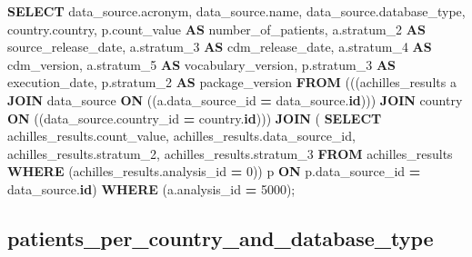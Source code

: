 \documentclass[
]{book}
\newenvironment{Shaded}{\begin{snugshade}}{\end{snugshade}}
\newcommand{\DecValTok}[1]{\textcolor[rgb]{0.00,0.00,0.81}{#1}}
\newcommand{\KeywordTok}[1]{\textcolor[rgb]{0.13,0.29,0.53}{\textbf{#1}}}
\newcommand{\NormalTok}[1]{#1}
\newcommand{\OperatorTok}[1]{\textcolor[rgb]{0.81,0.36,0.00}{\textbf{#1}}}
\begin{document}
\begin{Shaded}
\begin{Highlighting}[]
\KeywordTok{SELECT}\NormalTok{ data\_source.acronym,}
\NormalTok{   data\_source.name,}
\NormalTok{   data\_source.database\_type,}
\NormalTok{   country.country,}
\NormalTok{   p.count\_value }\KeywordTok{AS}\NormalTok{ number\_of\_patients,}
\NormalTok{   a.stratum\_2 }\KeywordTok{AS}\NormalTok{ source\_release\_date,}
\NormalTok{   a.stratum\_3 }\KeywordTok{AS}\NormalTok{ cdm\_release\_date,}
\NormalTok{   a.stratum\_4 }\KeywordTok{AS}\NormalTok{ cdm\_version,}
\NormalTok{   a.stratum\_5 }\KeywordTok{AS}\NormalTok{ vocabulary\_version,}
\NormalTok{   p.stratum\_3 }\KeywordTok{AS}\NormalTok{ execution\_date,}
\NormalTok{   p.stratum\_2 }\KeywordTok{AS}\NormalTok{ package\_version}
  \KeywordTok{FROM}\NormalTok{ (((achilles\_results a}
    \KeywordTok{JOIN}\NormalTok{ data\_source }\KeywordTok{ON}\NormalTok{ ((a.data\_source\_id }\OperatorTok{=}\NormalTok{ data\_source.}\KeywordTok{id}\NormalTok{)))}
    \KeywordTok{JOIN}\NormalTok{ country }\KeywordTok{ON}\NormalTok{ ((data\_source.country\_id }\OperatorTok{=}\NormalTok{ country.}\KeywordTok{id}\NormalTok{)))}
    \KeywordTok{JOIN}\NormalTok{ ( }\KeywordTok{SELECT}\NormalTok{ achilles\_results.count\_value,}
\NormalTok{            achilles\_results.data\_source\_id,}
\NormalTok{            achilles\_results.stratum\_2,}
\NormalTok{            achilles\_results.stratum\_3}
           \KeywordTok{FROM}\NormalTok{ achilles\_results}
           \KeywordTok{WHERE}\NormalTok{ (achilles\_results.analysis\_id }\OperatorTok{=} \DecValTok{0}\NormalTok{)) p}
      \KeywordTok{ON}\NormalTok{ p.data\_source\_id }\OperatorTok{=}\NormalTok{ data\_source.}\KeywordTok{id}\NormalTok{)}
 \KeywordTok{WHERE}\NormalTok{ (a.analysis\_id }\OperatorTok{=} \DecValTok{5000}\NormalTok{);}
\end{Highlighting}
\end{Shaded}

\hypertarget{patients_per_country_and_database_type}{%
\subsection*{patients\_per\_country\_and\_database\_type}\label{patients_per_country_and_database_type}}
\end{document}
